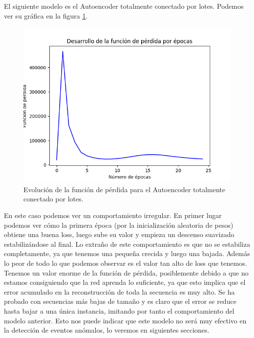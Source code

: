 El siguiente modelo es el Autoencoder totalmente conectado por lotes. Podemos ver su gráfica en la figura \ref{img:loss-autoencoder-fully-connected-batch}.
\begin{figure}[]
	\centering
	\includegraphics[scale=0.75]{imagenes/loss_autoencoder_fully_connected_batch.png}
	\caption{Evolución de la función de pérdida para el Autoencoder totalmente conectado por lotes.}
	\label{img:loss-autoencoder-fully-connected-batch}
\end{figure}

En este caso podemos ver un comportamiento irregular. En primer lugar podemos ver cómo la primera época (por la inicialización aleatoria de pesos) obtiene una buena loss, luego sube su valor y empieza un descenso suavizado estabilizándose al final. Lo extraño de este comportamiento es que no se estabiliza completamente, ya que tenemos una pequeña crecida y luego una bajada. Además lo peor de todo lo que podemos observar es el valor tan alto de loss que tenemos. Tenemos un valor enorme de la función de pérdida, posiblemente debido a que no estamos consiguiendo que la red aprenda lo suficiente, ya que esto implica que el error acumulado en la reconstrucción de toda la secuencia es muy alto. Se ha probado con secuencias más bajas de tamaño y es claro que el error se reduce hasta bajar a una única instancia, imitando por tanto el comportamiento del modelo anterior. Esto nos puede indicar que este modelo no será muy efectivo en la detección de eventos anómalos, lo veremos en siguientes secciones.

